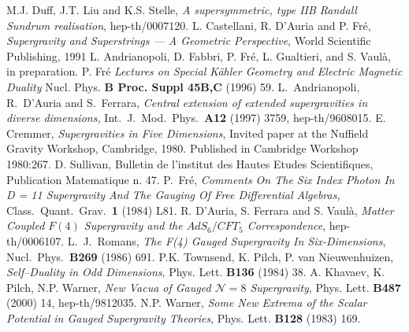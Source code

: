 \documentclass[a4paper,12pt]{article}
\begin{document}
\begin{thebibliography}{50}
 M.J. Duff, J.T. Liu and K.S. Stelle, {\it A supersymmetric,
type IIB Randall Sundrum realisation}, hep-th/0007120.
L. Castellani,  R. D'Auria and P. Fr\'e, {\it Supergravity and
Superstrings --- A Geometric Perspective}, World Scientific
Publishing, 1991
L. Andrianopoli, D. Fabbri, P. Fr\'e, L. Gualtieri, and S.
Vaul\`a, in preparation.
 P. Fr\'e {\it Lectures on Special K\"ahler
Geometry and Electric Magnetic Duality} Nucl. Phys. {\bf B Proc.
Suppl 45B,C} (1996) 59.
L.~Andrianopoli, R.~D'Auria and S.~Ferrara, {\it Central extension
of extended supergravities in diverse dimensions,} Int.\ J.\ Mod.\
Phys.\  {\bf A12} (1997) 3759, hep-th/9608015.
 E.
Cremmer, {\it Supergravities in Five Dimensions}, Invited paper at
the Nuffield Gravity Workshop, Cambridge, 1980. Published in
Cambridge Workshop 1980:267.
D. Sullivan, Bulletin de l'institut des Hautes Etudes
Scientifiques, Publication Matematique n. 47.
P.~Fr\'e, {\it Comments On The Six Index Photon In D = 11
Supergravity And The Gauging Of Free Differential Algebras,}
Class.\ Quant.\ Grav.\  {\bf 1} (1984) L81.
 R. D'Auria, S. Ferrara and S. Vaul\`a, {\it Matter Coupled $F(4)$
Supergravity and the $AdS_6/CFT_5$ Correspondence},
hep-th/0006107.
L.~J.~Romans, {\it The F(4) Gauged Supergravity In
Six-Dimensions}, Nucl.\ Phys.\  {\bf B269} (1986) 691.
P.K. Townsend, K. Pilch, P. van Nieuwenhuizen, {\it Self--Duality
in Odd Dimensions}, Phys. Lett. {\bf B136} (1984) 38.
A. Khavaev, K. Pilch, N.P. Warner, {\it New Vacua of Gauged
$\mathcal{N}=8$ Supergravity}, Phys. Lett. {\bf B487} (2000) 14,
hep-th/9812035.
N.P. Warner, {\it Some New Extrema of the Scalar Potential in
Gauged
  Supergravity Theories}, Phys. Lett. {\bf B128} (1983) 169.
\end{thebibliography}
\end{document}
